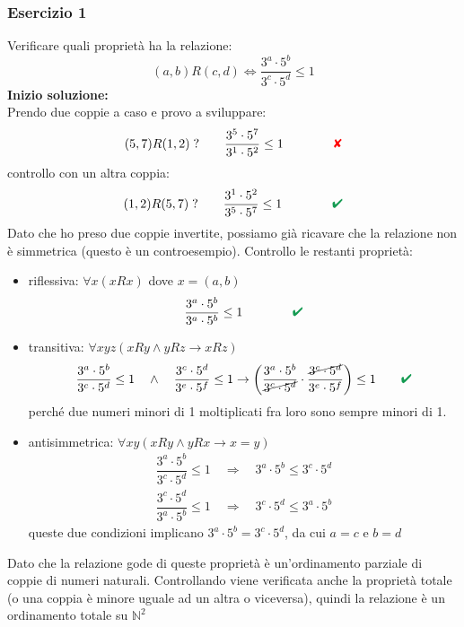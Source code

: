 \documentclass[italian]{article}
\newcommand{\crossmark}{\textcolor{red}{\text{$\qquad$\ding{56}}}}
\renewcommand{\checkmark}{\textcolor{ForestGreen}{\text{$\qquad$\ding{52}}}}
\newcommand{\ins}[1]{\text{$\mathbb{#1}$}}
\begin{document}
\subsubsection{Esercizio 1}
Verificare quali proprietà ha la relazione:
\[
	(a,b)R(c,d) \Leftrightarrow \dfrac{3^a\cdot5^b}{3^c\cdot5^d} \leq 1
\]
\textbf{Inizio soluzione:} \\[2mm]
Prendo due coppie a caso e provo a sviluppare:
\[
	(5,7)R(1,2)\;?\qquad \dfrac{3^5\cdot5^7}{3^1\cdot 5^2} \leq 1 \qquad \crossmark
\]
controllo con un altra coppia:
\[
	(1,2)R(5,7)\;?\qquad \dfrac{3^1\cdot5^2}{3^5\cdot 5^7} \leq 1 \qquad \checkmark
\]
Dato che ho preso due coppie invertite, possiamo già ricavare che la relazione non è simmetrica (questo è un controesempio). Controllo le restanti proprietà:
\begin{itemize}
	\item riflessiva: $\forall x(xRx)$ dove $x=(a,b)$
		\[
				\dfrac{3^a\cdot5^b}{3^a\cdot 5^b} \leq 1 \qquad \checkmark	
		\]
	\item transitiva: $\forall xyz(xRy \land yRz \to xRz)$
		\[
			\dfrac{3^a\cdot5^b}{3^c\cdot 5^d} \leq 1 \quad\land\quad \dfrac{3^c\cdot5^d}{3^e\cdot 5^f} \leq 1 \to \left(\dfrac{3^a\cdot5^b}{\cancel{3^c\cdot 5^d}} \cdot \dfrac{\cancel{3^c\cdot 5^d}}{3^e\cdot 5^f}\right) \leq 1 \checkmark
		\]
		perché due numeri minori di 1 moltiplicati fra loro sono sempre minori di 1.
	\item antisimmetrica: $\forall xy(xRy \land yRx \to x=y)$
		\begin{gather*}
			\dfrac{3^a\cdot5^b}{3^c\cdot 5^d} \leq 1 \quad\Rightarrow\quad 3^a\cdot5^b\leq3^c\cdot5^d \\[2mm]
			\dfrac{3^c\cdot5^d}{3^a\cdot 5^b} \leq 1 \quad\Rightarrow\quad 3^c\cdot5^d\leq3^a\cdot5^b
		\end{gather*}
		queste due condizioni implicano $3^a\cdot5^b = 3^c\cdot 5^d$, da cui $a=c$ e $b=d$ \checkmark
\end{itemize}
Dato che la relazione gode di queste proprietà è un'ordinamento parziale di coppie di numeri naturali. Controllando viene verificata anche la proprietà totale (o una coppia è minore uguale ad un altra o viceversa), quindi la relazione è un ordinamento totale su $\ins{N}^2$
\end{document}
